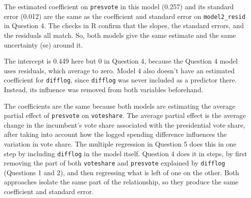 \documentclass[12pt,letterpaper]{article}
\begin{document}
\begin{enumerate}
		\noindent The estimated coefficient on \texttt{presvote} in this model (0.257) and its standard error (0.012) are the same as the coefficient and standard error on \texttt{model2\_resid} in Question 4. The checks in R confirm that the slopes, the standard errors, and the residuals all match. So, both models give the same estimate and the same uncertainty (se) around it.
		
		\noindent The intercept is 0.449 here but 0 in Question 4, because the Question 4 model uses residuals, which average to zero. Model 4 also doesn't have an estimated coefficient for \texttt{difflog}, since \texttt{difflog} was never included as a predictor there. Instead, its influence was removed from both variables beforehand.
		
		\noindent The coefficients are the same because both models are estimating the average partial effect of \texttt{presvote} on \texttt{voteshare}. The average partial effect is the average change in the incumbent's vote share associated with the presidential vote share, after taking into account how the logged spending difference influences the variation in vote share. The multiple regression in Question 5 does this in one step by including \texttt{difflog} in the model itself. Question 4 does it in steps, by first removing the part of both \texttt{voteshare} and \texttt{presvote} explained by \texttt{difflog} (Questions 1 and 2), and then regressing what is left of one on the other. Both approaches isolate the same part of the relationship, so they produce the same coefficient and standard error.
		\end{enumerate}
\end{document}
